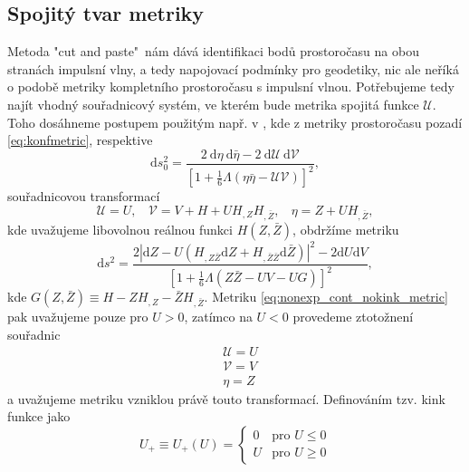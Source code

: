 \subsection{Spojitý tvar metriky}
Metoda "cut and paste"\ nám dává identifikaci bodů prostoročasu na obou stranách impulsní vlny, a tedy napojovací podmínky
pro geodetiky, nic ale neříká o podobě metriky kompletního prostoročasu s impulsní vlnou. Potřebujeme tedy najít vhodný
souřadnicový systém, ve kterém bude metrika spojitá funkce $\mathcal{U}$. Toho dosáhneme postupem použitým např. v
\cite{Podolsky:2014ysa}, kde z metriky prostoročasu pozadí \eqref{eq:konfmetric}, respektive
\begin{equation}
    \label{eq:null_background_metric}
    \mathrm{d}s_0^2 = \frac{2~\mathrm{d}\eta~\mathrm{d}\bar{\eta}-2~\mathrm{d}\mathcal{U}~\mathrm{d}\mathcal{V}}
    {\left[1+\frac{1}{6}\Lambda \left(\eta \bar{\eta}
    -\mathcal{U}\mathcal{V}\right)\right]^2},
\end{equation}
souřadnicovou transformací
\begin{equation}
    \label{eq:nonexp_cont_transform}
    \mathcal{U}=U,~~~~ \mathcal{V}=V+H+UH_{,Z}H_{,\bar{Z}},~~~~ \eta=Z+UH_{,\bar{Z}},
\end{equation}
kde uvažujeme libovolnou reálnou funkci $H(Z, \bar{Z})$, obdržíme metriku
\begin{equation}
    \label{eq:nonexp_cont_nokink_metric}
    \mathrm{d} s^{2}=\frac{2\left|\mathrm{d} Z-U\left(H_{, Z \bar{Z}} 
    \mathrm{d} Z+H_{, \bar{Z} \bar{Z}} \mathrm{d} \bar{Z}\right)\right|^{2}-2 \mathrm{d} U 
    \mathrm{d} V}{\left[1+\frac{1}{6} \Lambda(Z \bar{Z}-U V-U G)\right]^{2}},
\end{equation}
kde $G(Z, \bar{Z}) \equiv H - Z H_{,Z}-\bar{Z}H_{,\bar{Z}}$. Metriku \eqref{eq:nonexp_cont_nokink_metric} pak 
uvažujeme pouze pro $U>0$, zatímco na $U<0$ provedeme ztotožnení souřadnic
\begin{equation}
    \label{eq:transformation_just_rename}
    \begin{split}
        &\mathcal{U} = U \\
        &\mathcal{V} = V \\
        &\eta = Z
    \end{split}
\end{equation}
a uvažujeme metriku vzniklou právě touto transformací.
Definováním
tzv. kink funkce jako
\begin{equation}
    \label{eq:kink_function}
    U_+ \equiv U_+(U) = \begin{cases}
        0 & \text{pro } U \leq 0 \\
        U & \text{pro } U \geq 0
    \end{cases}
\end{equation}
